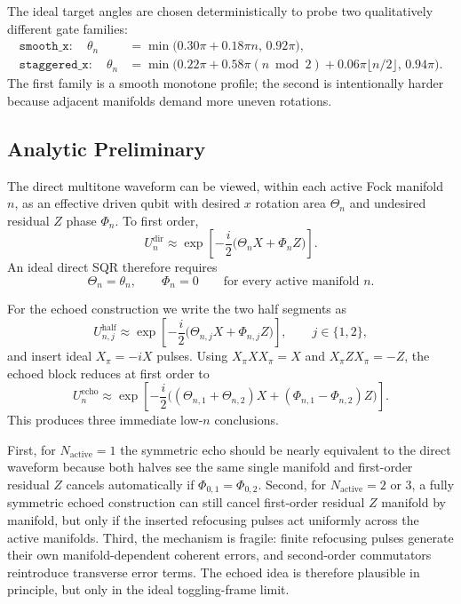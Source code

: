 \documentclass[aps,pra,twocolumn,reprint,floatfix,amsmath,amssymb]{revtex4-2}
\begin{document}
The ideal target angles are chosen deterministically to probe two qualitatively different gate families:
\begin{align}
\texttt{smooth\_x}: \quad
\theta_n &= \min\!\bigl(0.30\pi + 0.18\pi n,\, 0.92\pi\bigr),\\
\texttt{staggered\_x}: \quad
\theta_n &= \min\!\bigl(0.22\pi + 0.58\pi (n\bmod 2) + 0.06\pi \lfloor n/2 \rfloor,\, 0.94\pi\bigr).
\end{align}
The first family is a smooth monotone profile; the second is intentionally harder because adjacent manifolds demand more uneven rotations.

\subsection{Analytic Preliminary}
The direct multitone waveform can be viewed, within each active Fock manifold $n$, as an effective driven qubit with desired $x$ rotation area $\Theta_n$ and undesired residual $Z$ phase $\Phi_n$. To first order,
\begin{equation}
U_n^{\mathrm{dir}}
\approx
\exp\!\left[-\frac{i}{2}\bigl(\Theta_n X + \Phi_n Z\bigr)\right].
\label{eq:direct_first_order}
\end{equation}
An ideal direct SQR therefore requires
\begin{equation}
\Theta_n=\theta_n,\qquad \Phi_n=0
\qquad \text{for every active manifold } n.
\end{equation}

For the echoed construction we write the two half segments as
\begin{equation}
U_{n,j}^{\mathrm{half}}
\approx
\exp\!\left[-\frac{i}{2}\bigl(\Theta_{n,j} X + \Phi_{n,j} Z\bigr)\right],
\qquad j\in\{1,2\},
\end{equation}
and insert ideal $X_\pi=-iX$ pulses. Using $X_\pi X X_\pi = X$ and $X_\pi Z X_\pi = -Z$, the echoed block reduces at first order to
\begin{equation}
U_n^{\mathrm{echo}}
\approx
\exp\!\left[-\frac{i}{2}\bigl((\Theta_{n,1}+\Theta_{n,2})X + (\Phi_{n,1}-\Phi_{n,2})Z\bigr)\right].
\label{eq:echo_first_order}
\end{equation}
This produces three immediate low-$n$ conclusions.

First, for $N_{\mathrm{active}}=1$ the symmetric echo should be nearly equivalent to the direct waveform because both halves see the same single manifold and first-order residual $Z$ cancels automatically if $\Phi_{0,1}=\Phi_{0,2}$. Second, for $N_{\mathrm{active}}=2$ or $3$, a fully symmetric echoed construction can still cancel first-order residual $Z$ manifold by manifold, but only if the inserted refocusing pulses act uniformly across the active manifolds. Third, the mechanism is fragile: finite refocusing pulses generate their own manifold-dependent coherent errors, and second-order commutators reintroduce transverse error terms. The echoed idea is therefore plausible in principle, but only in the ideal toggling-frame limit.
\end{document}
